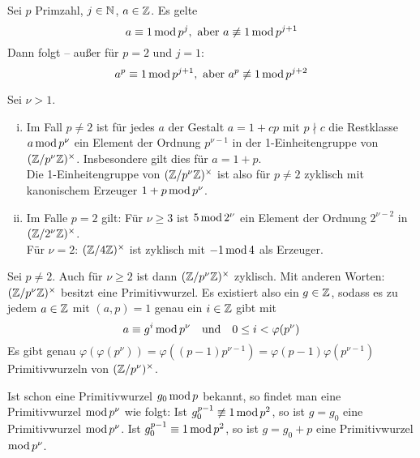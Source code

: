\newpage
\begin{lemma} \label{lemma_4.2}
	Sei $p$ Primzahl, $j \in \mathbb{N}$, $a \in \mathbb{Z}$. Es gelte
	\begin{equation}
		a \equiv 1 \operatorname{mod} p^j, \text{ aber } a \not\equiv 1 \operatorname{mod} p^{j+1} \label{eq_lemma_4.2_1}
	\end{equation}
	Dann folgt -- außer für $p=2$ und $j = 1$:
	\begin{equation}
		a^p \equiv 1 \operatorname{mod} p^{j+1}, \text{ aber } a^p \not\equiv 1 \operatorname{mod} p^{j+2} \label{eq_lemma_4.2_2}
	\end{equation}
\end{lemma}

\begin{falko} \label{F4.4}
	Sei $\nu > 1$. \begin{enumerate}[(i)]
		\item Im Fall $p \neq 2$ ist für jedes $a$ der Gestalt $a = 1+cp$ mit $p \nmid c$ die Restklasse $a \operatorname{mod} p^\nu$ ein Element der Ordnung $p^{\nu - 1}$ in der 1-Einheitengruppe von $(\mathbb{Z}/p^\nu\mathbb{Z})^\times$. Insbesondere gilt dies für $a = 1+p$. \\
		Die 1-Einheitengruppe von $(\mathbb{Z}/p^\nu\mathbb{Z})^\times$ ist also für $p \neq 2$ zyklisch mit kanonischem Erzeuger $1+p \operatorname{mod} p^\nu$.
		\item Im Falle $p=2$ gilt: Für $\nu \geq 3$ ist $5 \operatorname{mod} 2^\nu$ ein Element der Ordnung $2^{\nu-2}$ in $(\mathbb{Z}/2^\nu\mathbb{Z})^\times$. \\
		Für $\nu=2$: $(\mathbb{Z}/4\mathbb{Z})^\times$ ist zyklisch mit $-1 \operatorname{mod} 4$ als Erzeuger.
	\end{enumerate}
\end{falko}

\begin{satz} \label{satz_4.2}
	Sei $p \neq 2$. Auch für $\nu \geq 2$ ist dann $(\mathbb{Z}/p^\nu\mathbb{Z})^\times$ zyklisch. Mit anderen Worten: $(\mathbb{Z}/p^\nu\mathbb{Z})^\times$ besitzt eine Primitivwurzel. Es existiert also ein $g \in \mathbb{Z}$, sodass es zu jedem $a \in \mathbb{Z}$ mit $(a,p) = 1$ genau ein $i \in \mathbb{Z}$ gibt mit
	\[ a \equiv g^i \operatorname{mod} p^\nu \quad \text{und} \quad 0 \leq i < \varphi(p^\nu) \]
	Es gibt genau $\varphi(\varphi(p^\nu)) = \varphi((p-1)p^{\nu-1}) = \varphi(p-1) \varphi(p^{\nu-1})$ Primitivwurzeln von $(\mathbb{Z}/p^\nu)^\times$.
\end{satz}

	Ist schon eine Primitivwurzel $g_0 \operatorname{mod} p$ bekannt, so findet man eine Primitivwurzel $\operatorname{mod} p^\nu$ wie folgt: Ist $g_0^{p-1} \not\equiv 1 \operatorname{mod} p^2$, so ist $g = g_0$ eine Primitivwurzel $\operatorname{mod} p^\nu$. Ist $g_0^{p-1} \equiv 1 \operatorname{mod} p^2$, so ist $g = g_0 + p$ eine Primitivwurzel $\operatorname{mod} p^\nu$.
	
